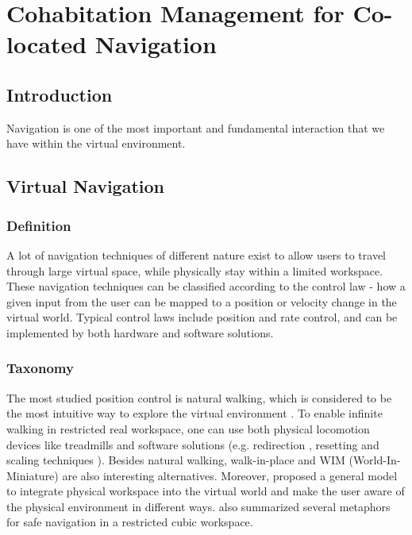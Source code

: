 \chapter{Cohabitation Management for Co-located Navigation}
\label{chapter:nav_cohab}
\minitoc

\section{Introduction}
Navigation is one of the most important and fundamental interaction that we have within the virtual environment.

\section{Virtual Navigation}

\subsection{Definition}
A lot of navigation techniques of different nature exist to allow users to travel through large virtual space, while physically stay within a limited workspace. These navigation techniques can be classified according to the control law - how a given input from the user can be mapped to a position or velocity change in the virtual world. Typical control laws include position and rate control, and can be implemented by both hardware and software solutions.

\subsection{Taxonomy}
The most studied position control is natural walking, which is considered to be the most intuitive way to explore the virtual environment \citep{Ruddle2009BW}. To enable infinite walking in restricted real workspace, one can use both physical locomotion devices like treadmills \citep{Iwata1999Treadmill} and software solutions (e.g. redirection \citep{Peck2008RED}, resetting \citep{Williams2007ELV} and scaling techniques \cite{Interrante2007SLB}). Besides natural walking, walk-in-place \citep{Razzaque2002RWP} and WIM (World-In-Miniature) \citep{Stoakley1995VRW} are also interesting alternatives. Moreover, \citet{Fleury2010Generic} proposed a general model to integrate physical workspace into the virtual world and make the user aware of the physical environment in different ways. \citet{Cirio2012Cube} also summarized several metaphors for safe navigation in a restricted cubic workspace.


